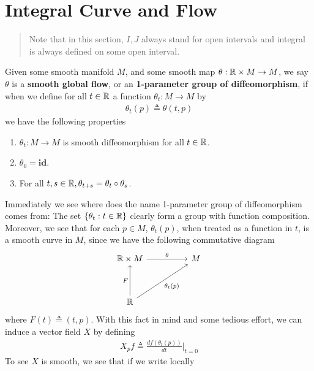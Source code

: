 \documentclass{report}
\begin{document}
\section{Integral Curve and Flow}
\begin{abstract}
Note that in this section, $I,J$ always stand for open intervals and integral is always defined on some open interval. 
\end{abstract}
\begin{mdframed}
Given some smooth manifold $M$, and some smooth map $\theta :\mathbb{R} \times M\rightarrow M$, we say $\theta$ is a \textbf{smooth global flow}, or an \textbf{1-parameter group of diffeomorphism}, if when we define for all $t\in\mathbb{R}$ a function $\theta_t:M\rightarrow M$ by
\begin{align*}
\theta_t(p)\triangleq \theta (t,p)
\end{align*}
we have the following properties 
\begin{enumerate}[label=(\roman*)]
  \item $\theta_t:M\rightarrow M$ is smooth diffeomorphism for all $t\in\mathbb{R}$. 
  \item $\theta_0=\textbf{id}$. 
  \item For all $t,s \in\mathbb{R},\theta_{t+s}=\theta_t \circ \theta_s$. 
\end{enumerate}
Immediately we see where does the name 1-parameter group of diffeomorphism comes from: The set  $\{ \theta_t: t\in\mathbb{R} \}$ clearly form a group with function composition. Moreover, we see that for each $p\in  M$, $\theta_t(p)$, when treated as a function in $t$, is a smooth curve in $M$, since we have the following commutative diagram 
\[\begin{tikzcd}
	{\mathbb{R}\times M} && M \\
	\\
	{\mathbb{R}}
	\arrow["\theta", from=1-1, to=1-3]
	\arrow["F", from=3-1, to=1-1]
	\arrow["{\theta_t(p)}"', from=3-1, to=1-3]
\end{tikzcd}\]
where $F(t)\triangleq (t,p)$. With this fact in mind and some tedious effort, we can induce a vector field $X$ by defining 
\begin{align}
\label{indf}
X_pf\triangleq \frac{df(\theta_t(p))}{dt}\Big|_{t=0}
\end{align}
To see $X$ is smooth, we see that if we write locally  
\begin{align*}

\end{align*}
\end{mdframed}
\end{document}

